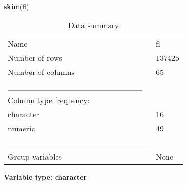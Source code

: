 \documentclass[
]{article}
\newenvironment{Shaded}{\begin{snugshade}}{\end{snugshade}}
\newcommand{\FunctionTok}[1]{\textcolor[rgb]{0.13,0.29,0.53}{\textbf{#1}}}
\newcommand{\NormalTok}[1]{#1}
\begin{document}
\begin{Shaded}
\begin{Highlighting}[]
\FunctionTok{skim}\NormalTok{(fl)}
\end{Highlighting}
\end{Shaded}

\begin{longtable}[]{@{}ll@{}}
\caption{Data summary}\tabularnewline
\toprule\noalign{}
\endfirsthead
\endhead
\bottomrule\noalign{}
\endlastfoot
Name & fl \\
Number of rows & 137425 \\
Number of columns & 65 \\
\_\_\_\_\_\_\_\_\_\_\_\_\_\_\_\_\_\_\_\_\_\_\_ & \\
Column type frequency: & \\
character & 16 \\
numeric & 49 \\
\_\_\_\_\_\_\_\_\_\_\_\_\_\_\_\_\_\_\_\_\_\_\_\_ & \\
Group variables & None \\
\end{longtable}

\textbf{Variable type: character}
\end{document}
